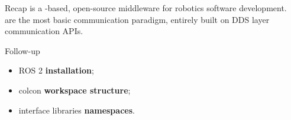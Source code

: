 
\begin{frame}{Recap}
 is a -based, open-source middleware for robotics software development.\\
 are the most basic communication paradigm, entirely built on DDS layer communication APIs.
\begin{block}{Follow-up}
  \begin{itemize}
    \item ROS 2 \textbf{installation};
    \item colcon \textbf{workspace structure};
    \item interface libraries \textbf{namespaces}.
  \end{itemize}
\end{block}
\end{frame}
